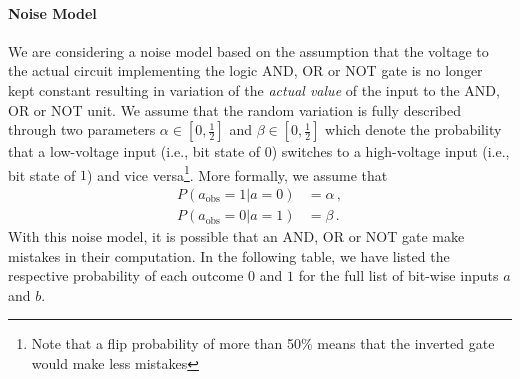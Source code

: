 \paragraph{Noise Model} We are considering a noise model based on the assumption that the voltage to the actual circuit implementing the logic AND, OR or NOT gate is no longer kept constant resulting in variation of the {\em actual value} of the input to the AND, OR or NOT unit. We assume that the random variation is fully described through two parameters $\alpha \in \left[0,\frac{1}{2}\right]$ and $\beta \in \left[0,\frac{1}{2}\right]$ which denote the probability that a low-voltage input (i.e., bit state of $0$) switches to a high-voltage input (i.e., bit state of $1$) and vice versa\footnote{Note that a flip probability of more than 50\% means that the inverted gate would make less mistakes}. More formally, we assume that
\begin{align}
    P(a_\text{obs} = 1 | a = 0) & = \alpha\,, \label{eq:bit_flip_to_1} \\
    P(a_\text{obs} = 0 | a = 1) & = \beta\,. \label{eq:bit_flip_to_0}
\end{align}
With this noise model, it is possible that an AND, OR or NOT gate make mistakes in their computation. In the following table, we have listed the respective probability of each outcome $0$ and $1$ for the full list of bit-wise inputs $a$ and $b$.

